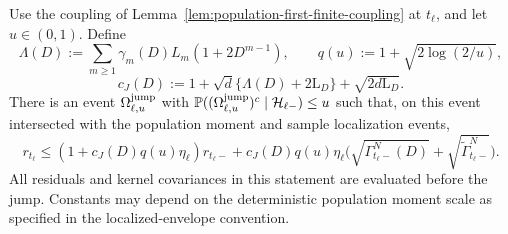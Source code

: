 \begin{lemma}
\label{lem:jump-bound-common-seed}
Use the coupling of Lemma~\ref{lem:population-first-finite-coupling} at
$t_\ell$, and let $u\in(0,1)$. Define
\[
\Lambda(D):=\sum_{m\ge1}\gamma_m(D)L_m(1+2D^{m-1}),\qquad
q(u):=1+\sqrt{2\log(2/u)},
\]
\[
c_J(D):=1+\sqrt d\{\Lambda(D)+2\mathrm L_D\}+\sqrt{2d\mathrm L_D}.
\]
There is an event $\Omega_{\ell,u}^{\rm jump}$ with
$\mathbb P((\Omega_{\ell,u}^{\rm jump})^c\mid\mathcal H_{\ell-})\le u$
such that, on this event intersected with the population moment and sample
localization events,
\[
r_{t_\ell}\le (1+c_J(D)q(u)\eta_\ell)r_{t_\ell-}
+c_J(D)q(u)\eta_\ell
  \bigl(\sqrt{\Gamma_{t_\ell-}^N(D)}+\sqrt{\widetilde\Gamma_{t_\ell-}^N}\bigr).
\]
All residuals and kernel covariances in this statement are evaluated before
the jump. Constants may depend on the deterministic population moment scale
as specified in the localized-envelope convention.
\end{lemma}
